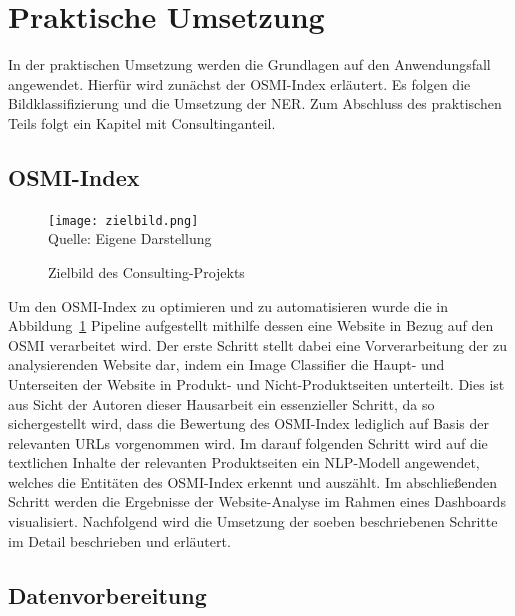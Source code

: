 \newpage
\section{Praktische Umsetzung} \label{sec_praktische_umsetzung}

In der praktischen Umsetzung werden die Grundlagen auf den Anwendungsfall angewendet. Hierfür wird zunächst der \ac{OSMI}-Index erläutert.
Es folgen die Bildklassifizierung und die Umsetzung der \acf{NER}. Zum Abschluss des praktischen Teils folgt ein Kapitel
mit Consultinganteil.

\subsection{OSMI-Index} \label{subsec_osmi}

\begin{figure}[H]
	\caption{Zielbild des Consulting-Projekts}\label{fig:zielbild}
	\texttt{[image: zielbild.png]}
	\\
	Quelle: Eigene Darstellung
\end{figure}

Um den OSMI-Index zu optimieren und zu automatisieren wurde die in Abbildung~\ref{fig:zielbild} Pipeline aufgestellt mithilfe dessen
eine Website in Bezug auf den OSMI verarbeitet wird.
Der erste Schritt stellt dabei eine Vorverarbeitung der zu analysierenden Website dar, indem ein Image Classifier die Haupt- und Unterseiten der Website in
Produkt- und Nicht-Produktseiten unterteilt.
Dies ist aus Sicht der Autoren dieser Hausarbeit ein essenzieller Schritt, da so sichergestellt wird, dass die Bewertung des OSMI-Index lediglich auf Basis
der relevanten URLs vorgenommen wird.
Im darauf folgenden Schritt wird auf die textlichen Inhalte der relevanten Produktseiten ein \ac{NLP}-Modell angewendet, welches die Entitäten des OSMI-Index erkennt und auszählt.
Im abschließenden Schritt werden die Ergebnisse der Website-Analyse im Rahmen eines Dashboards visualisiert.
Nachfolgend wird die Umsetzung der soeben beschriebenen Schritte im Detail beschrieben und erläutert.

\subsection{Datenvorbereitung}

